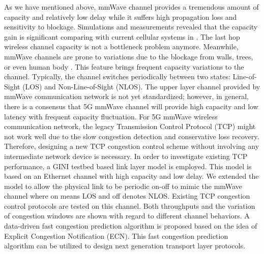 \par As we have mentioned above, mmWave channel provides a tremendous amount of capacity and relatively low delay while it suffers high propagation loss and sensitivity to blockage. Simulations and measurements revealed that the capacity gain is significant comparing with current cellular systems in \cite{akdeniz2014millimeter,bai2015coverage}. The last hop wireless channel capacity is not a bottleneck problem anymore. Meanwhile, mmWave channels are prone to variations due to the blockage from walls, trees, or even human body \cite{lu2012modeling, zhao201328, alejos2008measurement}. This feature brings frequent capacity variations to the channel. Typically, the channel switches periodically between two states: Line-of-Sight (LOS) and Non-Line-of-Sight (NLOS). The upper layer channel provided by mmWave communication network is not yet standardized; however, in general, there is a consensus that 5G mmWave channel will provide high capacity and low latency with frequent capacity fluctuation. For 5G mmWave wireless communication network, the legacy Transmission Control Protocol (TCP) might not work well due to the slow congestion detection and conservative loss recovery. Therefore, designing a new TCP congestion control scheme without involving any intermediate network device is necessary. In order to investigate existing TCP performance, a GINI testbed based link layer model is employed. This model is based on an Ethernet channel with high capacity and low delay. We extended the model to allow the physical link to be periodic on-off to mimic the mmWave channel where on means LOS and off denotes NLOS. Existing TCP congestion control protocols are tested on this channel. Both throughputs and the variation of congestion windows are shown with regard to different channel behaviors. A data-driven fast congestion prediction algorithm is proposed based on the idea of Explicit Congestion Notification (ECN). This fast congestion prediction algorithm can be utilized to design next generation transport layer protocols.
